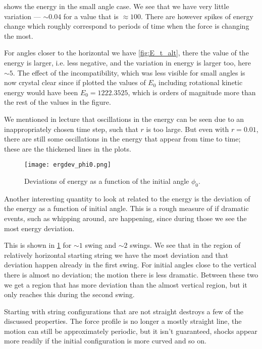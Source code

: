 \documentclass[10pt,a4paper,twocolumn]{article}
\begin{document}
 shows the energy in the small angle case. We see that we have very little variation --- $\sim\! 0.04$ for a value that is $\approx 100$. There are however spikes of energy change which roughly correspond to periods of time when the force is changing the most.

For angles closer to the horizontal we have \cref{fig:E_t_alt}, there the value of the energy is larger, i.e. less negative, and the variation in energy is larger too, here $\sim\!5$. The effect of the incompatibility, which was less visible for small angles is now crystal clear since if plotted the values of $E_0$ including rotational kinetic energy would have been $E_0 = 1222.3525$, which is orders of magnitude more than the rest of the values in the figure.

We mentioned in lecture that oscillations in the energy can be seen due to an inappropriately chosen time step, such that $r$ is too large. But even with $r=0.01$, there are still some oscillations in the energy that appear from time to time; these are the thickened lines in the plots.

\begin{figure}[!t]
    \centering
    \texttt{[image: ergdev\_phi0.png]}
    \caption{Deviations of energy as a function of the initial angle $\phi_0$.}
    \label{fig:Edev_phi0}
\end{figure}

Another interesting quantity to look at related to the energy is the deviation of the energy as a function of initial angle. This is a rough measure of if dramatic events, such as whipping around, are happening, since during those we see the most energy deviation. 

This is shown in \cref{fig:Edev_phi0} for $\sim\!1$ swing and $\sim\!2$ swings. We see that in the region of relatively horizontal starting string we have the most deviation and that deviation happen already in the first swing. For initial angles close to the vertical there is almost no deviation; the motion there is less dramatic. Between these two we get a region that has more deviation than the almost vertical region, but it only reaches this during the second swing.

Starting with string configurations that are not straight destroys a few of the discussed properties. The force profile is no longer a mostly straight line, the motion can still be approximately periodic, but it isn't guaranteed, shocks appear more readily if the initial configuration is more curved and so on.
\end{document}
